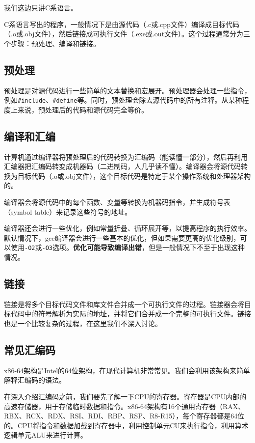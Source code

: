 \documentclass[../main.tex]{subfiles}
\begin{document}
我们这边只讲C系语言。

C系语言写出的程序，一般情况下是由源代码（.c或.cpp文件）编译成目标代码（.o或.obj文件），然后链接成可执行文件（.exe或.out文件）。这个过程通常分为三个步骤：预处理、编译和链接。

\subsection{预处理}
预处理是对源代码进行一些简单的文本替换和宏展开。预处理器会处理一些指令，例如\texttt{\#include}、\texttt{\#define}等。同时，预处理会除去源代码中的所有注释。从某种程度上来说，预处理后的代码和源代码完全等价。

\subsection{编译和汇编}
计算机通过编译器将预处理后的代码转换为汇编码（能读懂一部分），然后再利用汇编器把汇编码转变成机器码（二进制码，人几乎读不懂）。编译器会将源代码转换为目标代码（.o或.obj文件），这个目标代码是特定于某个操作系统和处理器架构的。

编译器会将源代码中的每个函数、变量等转换为机器码指令，并生成符号表（symbol table）来记录这些符号的地址。

编译器还会进行一些优化，例如常量折叠、循环展开等，以提高程序的执行效率。默认情况下，gcc编译器会进行一些基本的优化，但如果需要更高的优化级别，可以使用\texttt{-O2}或\texttt{-O3}选项。\textbf{优化可能导致编译出错}，但是一般情况下不至于出现这种情况。

\subsection{链接}
链接是将多个目标代码文件和库文件合并成一个可执行文件的过程。链接器会将目标代码中的符号解析为实际的地址，并将它们合并成一个完整的可执行文件。链接也是一个比较复杂的过程，在这里我们不深入讨论。

\subsection{常见汇编码}

x86-64架构是Intel的64位架构，在现代计算机非常常见。我们会利用该架构来简单解释汇编码的语法。

在深入介绍汇编码之前，我们要先了解一下CPU的寄存器。寄存器是CPU内部的高速存储器，用于存储临时数据和指令。x86-64架构有16个通用寄存器（RAX、RBX、RCX、RDX、RSI、RDI、RBP、RSP、R8-R15），每个寄存器都是64位的。CPU将指令和数据加载到寄存器中，利用控制单元CU来执行指令，利用算术逻辑单元ALU来进行计算。
\end{document}
